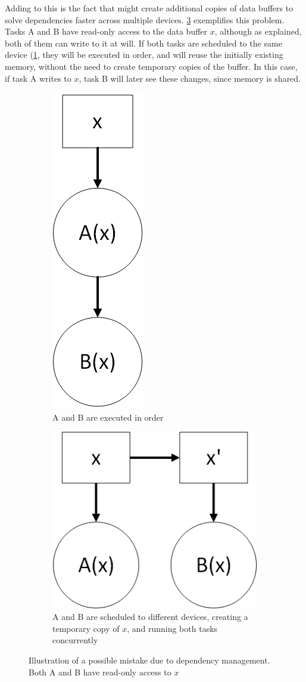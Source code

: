 \documentclass[main.tex]{subfiles}
\begin{document}
Adding to this is the fact that \starpu might create additional copies of data buffers to solve dependencies faster across multiple devices. \cref{fig:deps_problem} exemplifies this problem. Tasks A and B have read-only access to the data buffer $x$, although as explained, both of them can write to it at will. If both tasks are scheduled to the same device (\cref{fig:deps_problem:a}, they will be executed in order, and \starpu will reuse the initially existing memory, without the need to create temporary copies of the buffer. In this case, if task A writes to $x$, task B will later see these changes, since memory is shared.


\begin{figure}[!htp]
  \centering
  \begin{subfigure}{.5\textwidth}
    \centering
    \includegraphics[width=0.2\linewidth]{visio/starpu_dep_rw}
    \caption{A and B are executed in order \label{fig:deps_problem:a}}
  \end{subfigure}%
  \begin{subfigure}{.5\textwidth}
    \centering
    \includegraphics[width=0.6\linewidth]{visio/starpu_dep_rw_caveat}
    \caption{A and B are scheduled to different devices, creating a temporary copy of $x$, and running both tasks concurrently \label{fig:deps_problem:b}}
  \end{subfigure}
  \caption{Illustration of a possible mistake due to dependency management. Both A and B have read-only access to $x$ \label{fig:deps_problem}}
\end{figure}
\end{document}
